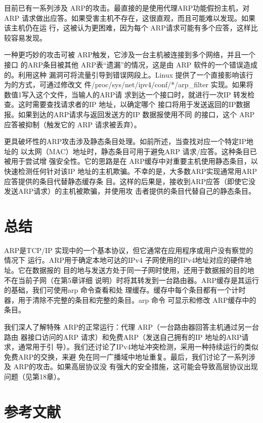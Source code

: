 目前已有一系列涉及 ARP的攻击。最直接的是使用代理ARP功能假扮主机，对ARP
请求做出应答。如果受害主机不存在，这很直观，而且可能难以发现。如果该主机仍在运
行，这被认为更困难，因为每个 ARP请求可能有多个应答，这样比较容易发现。

一种更巧妙的攻击可被 ARP触发，它涉及一台主机被连接到多个网络，并且一个接口
的ARP条目被其他 ARP表“遗漏”的情况，这是由 ARP 软件的一个错误造成的。利用这种
漏洞可将流量引导到错误网段上。Linux 提供了一个直接影响该行为的方式，可通过修改文
件/proc/sys/net/ipv4/conf/*/arp\_filter 实现。如果将数值1写入这个文件，当输人的ARP请
求到达一个接口时，就进行一次IP 转发检查。这时需要查找请求者的IP 地址，以确定哪个
接口将用于发送返回的IP数据报。如果到达的ARP请求与返回发送方的IP 数据报使用不同
的接口，这个 ARP应答被抑制（触发它的 ARP 请求被丢弃）。

更具破坏性的ARP攻击涉及静态条目处理。如前所述，当查找对应一个特定IP地址的
以太网（MAC）地址时，静态条目可用于避免ARP 请求/应答。这种条目已被用于尝试增
强安全性。它的思路是在 ARP缓存中对重要主机使用静态条目，以快速检测任何针对该IP
地址的主机欺骗。不幸的是，大多数ARP实现通常用ARP应答提供的条目代替静态缓存条
目。这样的后果是，接收到ARP应答（即使它没发送ARP请求）的主机被欺骗，并使用攻
击者提供的条目代替自己的静态条目。

\section{总结}

ARP是TCP/IP 实现中的一个基本协议，但它通常在应用程序或用户没有察觉的情况下
运行。ARP用于确定本地可达的IPv4 子网使用的IPv4地址对应的硬件地址。它在数据报的
目的地与发送方处于同一子网时使用，还用于数据报的目的地不在当前子网（在第5章详细
说明）时将其转发到一台路由器。ARP缓存是其运行的基础，我们可使用arp 命令查看和处
理缓存。缓存中每个条目都有一个计时器，用于清除不完整的条目和完整的条目。arp 命令
可显示和修改 ARP缓存中的条目。

我们深人了解特殊 ARP的正常运行：代理 ARP（一台路由器回答主机通过另一台路由
器接口访问的ARP 请求）和免费ARP（发送自己拥有的IP 地址的ARP请求，通常用于引
导）。我们还讨论了IPv4地址冲突检测，采用一种持续运行的类似免费ARP的交换，来避
免在同一广播域中地址重复。最后，我们讨论了一系列涉及 ARP的攻击。如果高层协议没
有强大的安全措施，这可能会导致高层协议出现问题（见第18章）。

\section{参考文献}